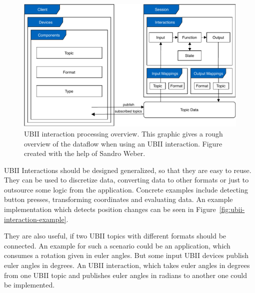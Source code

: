 \begin{figure}[htpb]
  \centering
  \includegraphics[width=12cm]{figures/ubii_cd.pdf}
  \caption[UBII communication diagram]{\ac{UBII} interaction processing overview. This graphic gives a rough overview of the dataflow when using an \ac{UBII} interaction. Figure created with the help of Sandro Weber.}\label{fig:ubii-cd}
\end{figure}

\ac{UBII} Interactions should be designed generalized, so that they are easy to reuse. They can be used to discretize data, converting data to other formats or just to outsource some logic from the application. Concrete examples include detecting button presses, transforming coordinates and evaluating data. An example implementation which detects position changes can be seen in Figure~\ref{fig:ubii-interaction-example}.

They are also useful, if two \ac{UBII} topics with different formats should be connected. An example for such a scenario could be an application, which consumes a rotation given in euler angles. But some input \ac{UBII} devices publish euler angles in degrees. An \ac{UBII} interaction, which takes euler angles in degrees from one \ac{UBII} topic and publishes euler angles in radians to another one could be implemented.

